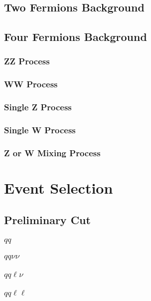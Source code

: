\subsection{Two Fermions Background}

\subsection{Four Fermions Background}

\subsubsection{ZZ Process}
\subsubsection{WW Process}
\subsubsection{Single Z Process}
\subsubsection{Single W Process}
\subsubsection{Z or W Mixing Process}


\section{Event Selection}

\subsection{Preliminary Cut}
\subsubsection{$qq$}
\subsubsection{$qq\nu\nu$}
\subsubsection{$qq\ell\nu$}
\subsubsection{$qq\ell\ell$}
